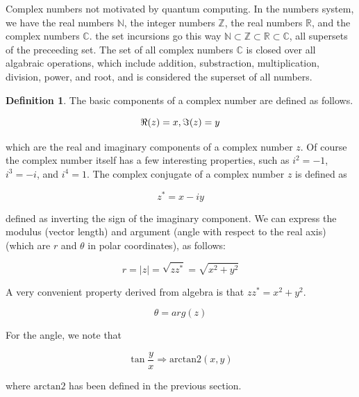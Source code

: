 \documentclass[12pt]{article}
\theoremstyle{definition}
\newtheorem{definition}[theorem]{Definition}
\begin{document}









Complex numbers not motivated by quantum computing. In the numbers system, we have the real numbers $\mathbb{N}$, the integer numbers $\mathbb{Z}$, the real numbers $\mathbb{R}$, and the complex numbers $\mathbb{C}$. the set incursions go this way $\mathbb{N} \subset \mathbb{Z} \subset \mathbb{R} \subset \mathbb{C}$, all supersets of the preceeding set. The set of all complex numbers $\mathbb{C}$ is closed over all algabraic operations, which include addition, substraction, multiplication, division, power, and root, and is considered the superset of all numbers. 

\begin{definition}
    The basic components of a complex number are defined as follows. 

    $$\real(z) = x, \imaginary(z) = y$$

    which are the real and imaginary components of a complex number $z$. Of course the complex number itself has a few interesting properties, such as $i^2 = -1$, $i^3 = -i$, and $i^4 = 1$. The complex conjugate of a complex number $z$ is defined as 

    $$z^* = x - iy$$

    defined as inverting the sign of the imaginary component. We can express the modulus (vector length) and argument (angle with respect to the real axis) (which are $r$ and $\theta$ in polar coordinates), as follows:

    $$r = \vert z \vert = \sqrt{zz^*} = \sqrt{x^2 + y^2}$$

    A very convenient property derived from algebra is that $zz^* = x^2 + y^2$.

    $$\theta = arg(z)$$

    For the angle, we note that

    $$\tan \frac{y}{x} \Longrightarrow \mathrm{arctan2}(x, y)$$

    where $\mathrm{arctan2}$ has been defined in the previous section. 
\end{definition}
\end{document}
